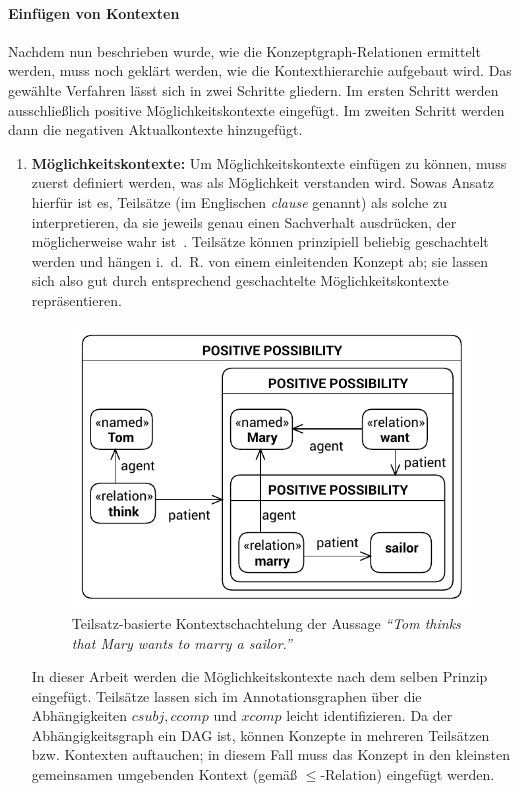\paragraph{Einfügen von Kontexten}
Nachdem nun beschrieben wurde, wie die Konzeptgraph-Relationen ermittelt werden, muss noch geklärt werden, wie die Kontexthierarchie aufgebaut wird.
Das gewählte Verfahren lässt sich in zwei Schritte gliedern.
Im ersten Schritt werden ausschließlich positive Möglichkeitskontexte eingefügt.
Im zweiten Schritt werden dann die negativen Aktualkontexte hinzugefügt.
\begin{enumerate}
	\item \textbf{Möglichkeitskontexte:}
		Um Möglichkeitskontexte einfügen zu können, muss zuerst definiert werden, was als Möglichkeit verstanden wird.
		Sowas Ansatz hierfür ist es, Teilsätze (im Englischen \textit{clause} genannt) als solche zu interpretieren, da sie jeweils genau einen Sachverhalt ausdrücken, der möglicherweise wahr ist~\cite[Abschnitt 5.4]{Harmelen2007}.
		Teilsätze können prinzipiell beliebig geschachtelt werden und hängen i.~d.~R. von einem einleitenden Konzept ab;
		sie lassen sich also gut durch entsprechend geschachtelte Möglichkeitskontexte repräsentieren.
		\begin{figure}[t]
			\centering
			\includegraphics[scale=\cgScale]{gfx/text2kg/contextExtractionGraph1.pdf}
			\caption{Teilsatz-basierte Kontextschachtelung der Aussage \textit{``Tom thinks that Mary wants to marry a sailor.''}}\label{fig:text2kg:contextExtractionGraph1} %
		\end{figure}
		In dieser Arbeit werden die Möglichkeitskontexte nach dem selben Prinzip eingefügt.
		Teilsätze lassen sich im Annotationsgraphen über die Abhängigkeiten $csubj, ccomp$ und $xcomp$ leicht identifizieren.
		Da der Abhängigkeitsgraph ein DAG ist, können Konzepte in mehreren Teilsätzen bzw. Kontexten auftauchen;
		in diesem Fall muss das Konzept in den kleinsten gemeinsamen umgebenden Kontext (gemäß $\leq$-Relation) eingefügt werden.


\end{enumerate}
